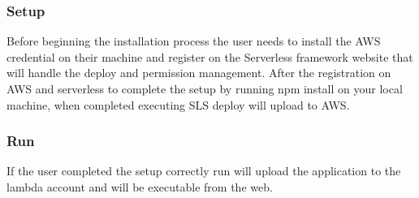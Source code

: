 \subsubsection{Setup}
Before beginning the installation process the user needs to install the AWS credential on their
machine and register on the Serverless framework website that will handle the deploy and permission
management. After the registration on AWS and serverless to complete the setup by running
npm install on your local machine, when completed executing SLS deploy will upload to AWS.
\subsubsection{Run}
If the user completed the setup correctly run  will upload the application to the lambda account and will be executable from the web.
